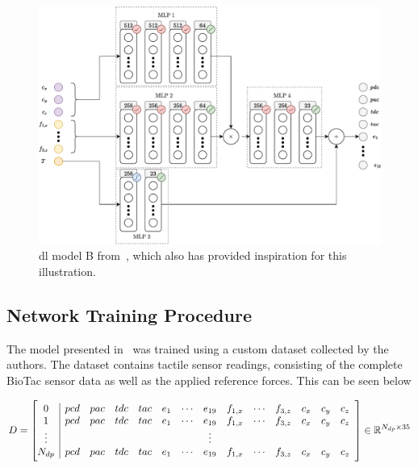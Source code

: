 
\begin{figure}[h]
		\begin{center}
			\includegraphics[width=\textwidth]{chapters/1-tactile-perception/fig/drawio/dl-model-tactile-perception-grouping-crop.pdf}
		\end{center}
		\caption{\gls{dl} model B from~\cite{simulation-of-the-syntouch-biotac-sensor}, which also has provided inspiration for this illustration.}
		\label{fig:dl-model-tactile-perception}
\end{figure}


\subsection{Network Training Procedure}\label{sec:1-tactile-perception-method-network-training-procedure}

The model presented in~ was trained using a custom dataset collected by the authors. The dataset  contains  tactile sensor readings, consisting of the complete BioTac sensor data as well as the applied reference forces. This can be seen below

\begin{equation} \label{eq:dl-data-matrix}
	D =
	\left[\begin{array}{@{}c|cccccccccccccc@{}}
		0       & pcd & pac & tdc & tac & e_{1} & \cdots & e_{19} & f_{1,x} & \cdots & f_{3,z} & c_x & c_y & c_z \\
		1       & pcd & pac & tdc & tac & e_{1} & \cdots & e_{19} & f_{1,x} & \cdots & f_{3,z} & c_x & c_y & c_z \\
		\vdots  &  &  &  &  &  &  & \vdots &  &  &  &  &  &  \\
		N_{dp}  & pcd & pac & tdc & tac & e_{1} & \cdots & e_{19} & f_{1,x} & \cdots & f_{3,z} & c_x & c_y & c_z
		\end{array}\right] \inR{N_{dp} \times 35}
\end{equation}

